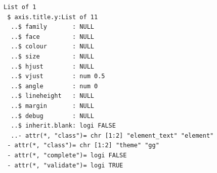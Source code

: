 \documentclass[
  a4paperpaper,
]{article}
\newenvironment{Shaded}{\begin{snugshade}}{\end{snugshade}}
\newcommand{\AttributeTok}[1]{\textcolor[rgb]{0.40,0.45,0.13}{#1}}
\newcommand{\DecValTok}[1]{\textcolor[rgb]{0.68,0.00,0.00}{#1}}
\newcommand{\FloatTok}[1]{\textcolor[rgb]{0.68,0.00,0.00}{#1}}
\newcommand{\FunctionTok}[1]{\textcolor[rgb]{0.28,0.35,0.67}{#1}}
\newcommand{\NormalTok}[1]{\textcolor[rgb]{0.00,0.23,0.31}{#1}}
\newcommand{\SpecialCharTok}[1]{\textcolor[rgb]{0.37,0.37,0.37}{#1}}
\newcommand{\StringTok}[1]{\textcolor[rgb]{0.13,0.47,0.30}{#1}}
\begin{document}
\begin{Shaded}
\end{Shaded}

\begin{verbatim}
List of 1
 $ axis.title.y:List of 11
  ..$ family       : NULL
  ..$ face         : NULL
  ..$ colour       : NULL
  ..$ size         : NULL
  ..$ hjust        : NULL
  ..$ vjust        : num 0.5
  ..$ angle        : num 0
  ..$ lineheight   : NULL
  ..$ margin       : NULL
  ..$ debug        : NULL
  ..$ inherit.blank: logi FALSE
  ..- attr(*, "class")= chr [1:2] "element_text" "element"
 - attr(*, "class")= chr [1:2] "theme" "gg"
 - attr(*, "complete")= logi FALSE
 - attr(*, "validate")= logi TRUE
\end{verbatim}
\end{document}

